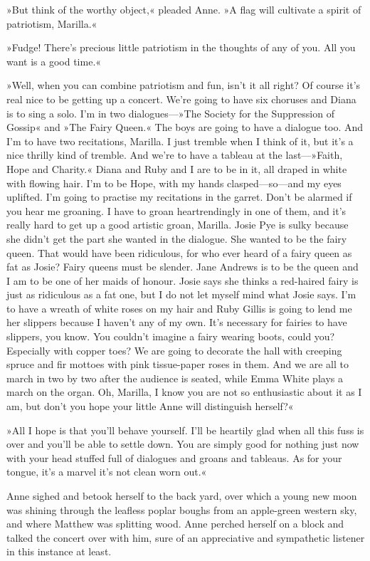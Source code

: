 »But think of the worthy object,« pleaded Anne. »A flag will cultivate a spirit of patriotism, Marilla.«

»Fudge! There’s precious little patriotism in the thoughts of any of you. All you want is a good time.«

»Well, when you can combine patriotism and fun, isn’t it all right? Of course it’s real nice to be getting up a concert. We’re going to have six choruses and Diana is to sing a solo. I’m in two dialogues—»The Society for the Suppression of Gossip« and »The Fairy Queen.« The boys are going to have a dialogue too. And I’m to have two recitations, Marilla. I just tremble when I think of it, but it’s a nice thrilly kind of tremble. And we’re to have a tableau at the last—»Faith, Hope and Charity.« Diana and Ruby and I are to be in it, all draped in white with flowing hair. I’m to be Hope, with my hands clasped—so—and my eyes uplifted. I’m going to practise my recitations in the garret. Don’t be alarmed if you hear me groaning. I have to groan heartrendingly in one of them, and it’s really hard to get up a good artistic groan, Marilla. Josie Pye is sulky because she didn’t get the part she wanted in the dialogue. She wanted to be the fairy queen. That would have been ridiculous, for who ever heard of a fairy queen as fat as Josie? Fairy queens must be slender. Jane Andrews is to be the queen and I am to be one of her maids of honour. Josie says she thinks a red-haired fairy is just as ridiculous as a fat one, but I do not let myself mind what Josie says. I’m to have a wreath of white roses on my hair and Ruby Gillis is going to lend me her slippers because I haven’t any of my own. It’s necessary for fairies to have slippers, you know. You couldn’t imagine a fairy wearing boots, could you? Especially with copper toes? We are going to decorate the hall with creeping spruce and fir mottoes with pink tissue-paper roses in them. And we are all to march in two by two after the audience is seated, while Emma White plays a march on the organ. Oh, Marilla, I know you are not so enthusiastic about it as I am, but don’t you hope your little Anne will distinguish herself?«

»All I hope is that you’ll behave yourself. I’ll be heartily glad when all this fuss is over and you’ll be able to settle down. You are simply good for nothing just now with your head stuffed full of dialogues and groans and tableaus. As for your tongue, it’s a marvel it’s not clean worn out.«

Anne sighed and betook herself to the back yard, over which a young new moon was shining through the leafless poplar boughs from an apple-green western sky, and where Matthew was splitting wood. Anne perched herself on a block and talked the concert over with him, sure of an appreciative and sympathetic listener in this instance at least.

